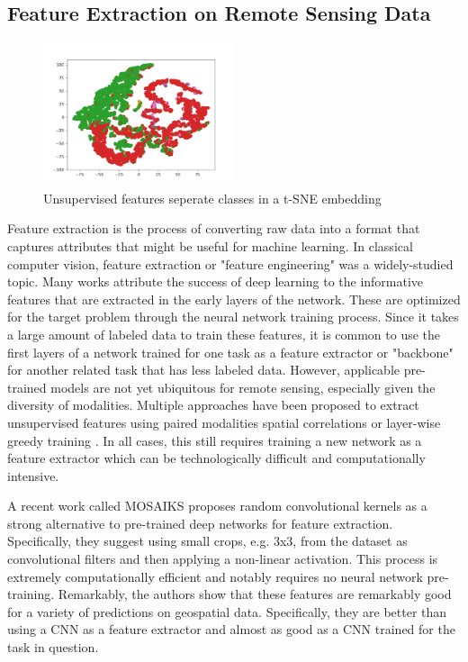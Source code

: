 \subsection{Feature Extraction on Remote Sensing Data}
\begin{figure}
    \centering
    \includegraphics[width=0.5\textwidth]{figs/methods/IPP/TSNE_features.png}
    \caption{Unsupervised features seperate classes in a t-SNE embedding}
    \label{fig:methods:ipp_feature_embedding}
\end{figure}
Feature extraction is the process of converting raw data into a format that captures attributes that might be useful for machine learning. In classical computer vision, feature extraction or "feature engineering" was a widely-studied topic. Many works attribute the success of deep learning to the informative features that are extracted in the early layers of the network. These are optimized for the target problem through the neural network training process. Since it takes a large amount of labeled data to train these features, it is common to use the first layers of a network trained for one task as a feature extractor or "backbone" for another related task that has less labeled data. However, applicable pre-trained models are not yet ubiquitous for remote sensing, especially given the diversity of modalities. Multiple approaches have been proposed to extract unsupervised features using paired modalities \cite{Xie2016TransferMapping} spatial correlations \cite{Jean2019Tile2Vec:Data} or layer-wise greedy training \cite{Romero2016UnsupervisedClassification}. In all cases, this still requires training a new network as a feature extractor which can be technologically difficult and computationally intensive.

A recent work called MOSAIKS \cite{Rolf2021} proposes random convolutional kernels as a strong alternative to pre-trained deep networks for feature extraction. Specifically, they suggest using small crops, e.g. 3x3, from the dataset as convolutional filters and then applying a non-linear activation. This process is extremely computationally efficient and notably requires no neural network pre-training. Remarkably, the authors show that these features are remarkably good for a variety of predictions on geospatial data. Specifically, they are better than using a CNN as a feature extractor and almost as good as a CNN trained for the task in question.

